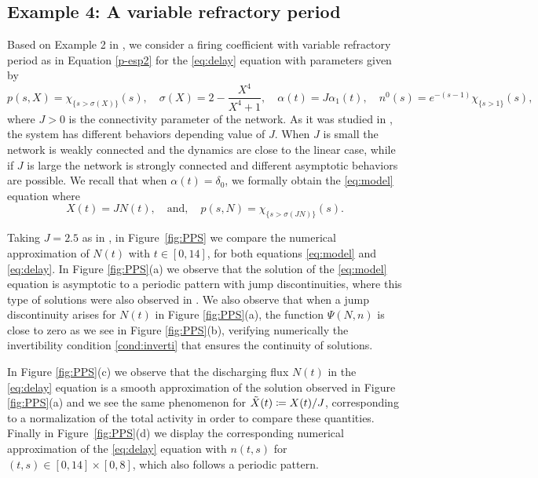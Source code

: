 \documentclass[11pt,a4paper]{article}
\begin{document}

\subsection*{Example 4: A variable refractory period \cite{pakdaman2009dynamics}}
Based on Example 2 in \cite{pakdaman2009dynamics}, we consider a firing coefficient with variable refractory period as in Equation \eqref{p-esp2} for the \eqref{eq:delay} equation with parameters given by 
\begin{equation}\label{exp4:PPS}
  p(s,X)=\chi_{\{s>\sigma(X)\}}(s),\quad  \sigma(X)=2-\frac{X^4}{X^4+1},  \quad \alpha(t)=J\alpha_1(t),\quad n^0(s)=e^{-(s-1)}\chi_{\{s>1\}}(s),
\end{equation}
where $J>0$ is the connectivity parameter of the network. As it was studied in \cite{pakdaman2009dynamics}, the system has different behaviors depending value of $J$. When $J$ is small the network is weakly connected and the dynamics are close to the linear case, while if $J$ is large the network is strongly connected and different asymptotic behaviors are possible. We recall that when $\alpha(t)=\delta_0$, we formally obtain the \eqref{eq:model} equation where 
\begin{equation}\label{exp4:PPSlocal}
 X(t)=JN(t),\quad\text{and},\quad  p(s,N)=\chi_{\{s>\sigma(JN)\}}(s).
\end{equation}

Taking $J=2.5$ as in \cite{pakdaman2009dynamics}, in Figure~\ref{fig:PPS} we compare the numerical approximation of $N(t)$ with $t\in[0,14]$, for both equations \eqref{eq:model} and \eqref{eq:delay}. In Figure \ref{fig:PPS}(a) we observe that the solution of the \eqref{eq:model} equation is asymptotic to a periodic pattern with jump discontinuities, where this type of solutions were also observed in \cite{torres2021elapsed}. We also observe that when a jump discontinuity arises for $N(t)$ in Figure \ref{fig:PPS}(a), the function $\Psi(N,n)$ is close to zero as we see in Figure \ref{fig:PPS}(b), verifying numerically the invertibility condition \eqref{cond:inverti} that ensures the continuity of solutions.

In Figure \ref{fig:PPS}(c) we observe that the discharging flux $N(t)$ in the \eqref{eq:delay} equation is a smooth approximation of the solution observed in Figure \ref{fig:PPS}(a) and we see the same phenomenon for $\Tilde{X}(t)\coloneqq X(t)/J$, corresponding to a normalization of the total activity in order to compare these quantities. Finally in Figure~\ref{fig:PPS}(d) we display the corresponding numerical approximation of the \eqref{eq:delay} equation with $n(t,s)$ for $(t,s)\in[0,14]\times[0,8]$, which also follows a periodic pattern.
\end{document}
